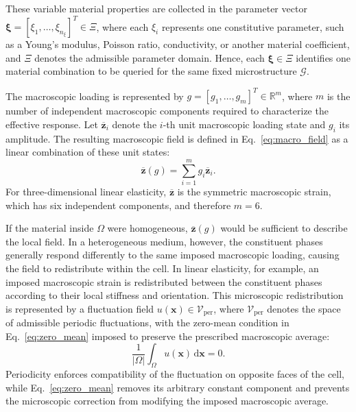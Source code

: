 \documentclass[pdflatex,sn-basic,Numbered]{sn-jnl}
\newcommand{\R}{\mathbb{R}}
\newcommand{\G}{\mathcal{G}}
\begin{document}
These variable material properties are collected in the parameter vector
\(\boldsymbol{\xi}=[\xi_1,\ldots,\xi_{n_\xi}]^T\in\Xi\), where each
\(\xi_i\) represents one constitutive parameter, such as a Young's modulus,
Poisson ratio, conductivity, or another material coefficient, and \(\Xi\)
denotes the admissible parameter domain. Hence, each
\(\boldsymbol{\xi}\in\Xi\) identifies one material combination to be queried
for the same fixed microstructure \(\G\).

The macroscopic loading is represented by
\(g=[g_1,\ldots,g_m]^T\in\R^m\), where \(m\) is the number of independent
macroscopic components required to characterize the effective response. Let
\(\overline{\boldsymbol z}_i\) denote the \(i\)-th unit macroscopic loading
state and \(g_i\) its amplitude. The resulting macroscopic field is defined in
Eq.~\eqref{eq:macro_field} as a linear combination of these unit states:
\begin{equation}
\label{eq:macro_field}
\overline{\boldsymbol z}(g)
=
\sum_{i=1}^{m}
g_i\overline{\boldsymbol z}_i.
\end{equation}
For three-dimensional linear elasticity,
\(\overline{\boldsymbol z}\) is the symmetric macroscopic strain, which has
six independent components, and therefore \(m=6\).

If the material inside \(\Omega\) were homogeneous,
\(\overline{\boldsymbol z}(g)\) would be sufficient to describe the local
field. In a heterogeneous medium, however, the constituent phases generally
respond differently to the same imposed macroscopic loading, causing the
field to redistribute within the cell. In linear elasticity, for example, an
imposed macroscopic strain is redistributed between the constituent phases
according to their local stiffness and orientation. This microscopic
redistribution is represented by a fluctuation field
\(u(\boldsymbol{x})\in\mathcal V_{\mathrm{per}}\), where
\(\mathcal V_{\mathrm{per}}\) denotes the space of admissible periodic
fluctuations, with the zero-mean condition in
Eq.~\eqref{eq:zero_mean} imposed to preserve the prescribed macroscopic
average:
\begin{equation}
\label{eq:zero_mean}
\frac{1}{|\Omega|}
\int_{\Omega}
u(\boldsymbol x)\,
\mathrm{d}\boldsymbol x
=
0.
\end{equation}
Periodicity enforces compatibility of the fluctuation on opposite faces of the
cell, while Eq.~\eqref{eq:zero_mean} removes its arbitrary constant component
and prevents the microscopic correction from modifying the imposed
macroscopic average.
\end{document}
